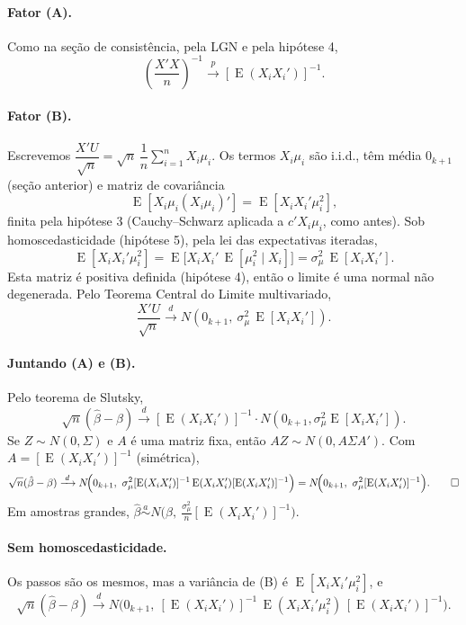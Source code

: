 \documentclass[12pt,a4paper]{article}
\newcommand{\E}{\operatorname{E}}
\newcommand{\convp}{\xrightarrow{\;p\;}}
\newcommand{\convd}{\xrightarrow{\;d\;}}
\begin{document}
\paragraph{Fator (A).} Como na seção de consistência, pela LGN e pela hipótese 4,
\[
  \left(\frac{X'X}{n}\right)^{-1}\convp[\E(X_iX_i')]^{-1}.
\]

\paragraph{Fator (B).} Escrevemos $\dfrac{X'U}{\sqrt n}=\sqrt n\,\dfrac1n\sum_{i=1}^nX_i\mu_i$. Os termos $X_i\mu_i$ são i.i.d., têm média $0_{k+1}$ (seção anterior) e matriz de covariância
\[
  \E[X_i\mu_i(X_i\mu_i)']=\E[X_iX_i'\mu_i^2],
\]
finita pela hipótese 3 (Cauchy--Schwarz aplicada a $c'X_i\mu_i$, como antes). Sob homoscedasticidade (hipótese 5), pela lei das expectativas iteradas,
\[
  \E[X_iX_i'\mu_i^2]=\E\big[X_iX_i'\,\E[\mu_i^2\mid X_i]\big]=\sigma_\mu^2\,\E[X_iX_i'].
\]
Esta matriz é positiva definida (hipótese 4), então o limite é uma normal não degenerada. Pelo Teorema Central do Limite multivariado,
\[
  \frac{X'U}{\sqrt n}\convd N\!\left(0_{k+1},\ \sigma_\mu^2\,\E[X_iX_i']\right).
\]

\paragraph{Juntando (A) e (B).} Pelo teorema de Slutsky,
\[
  \sqrt n(\hat\beta-\beta)\convd[\E(X_iX_i')]^{-1}\cdot N\!\left(0_{k+1},\sigma_\mu^2\E[X_iX_i']\right).
\]
Se $Z\sim N(0,\Sigma)$ e $A$ é uma matriz fixa, então $AZ\sim N(0,A\Sigma A')$. Com $A=[\E(X_iX_i')]^{-1}$ (simétrica),
\[
  \sqrt n(\hat\beta-\beta)\convd N\!\Big(0_{k+1},\ \sigma_\mu^2[\E(X_iX_i')]^{-1}\E(X_iX_i')[\E(X_iX_i')]^{-1}\Big)
  = N\!\Big(0_{k+1},\ \sigma_\mu^2[\E(X_iX_i')]^{-1}\Big). \qed
\]
Em amostras grandes, $\hat\beta\overset{a}{\sim}N\!\big(\beta,\ \tfrac{\sigma_\mu^2}{n}[\E(X_iX_i')]^{-1}\big)$.

\paragraph{Sem homoscedasticidade.} Os passos são os mesmos, mas a variância de (B) é $\E[X_iX_i'\mu_i^2]$, e
\[
  \sqrt n(\hat\beta-\beta)\convd N\!\Big(0_{k+1},\ [\E(X_iX_i')]^{-1}\,\E(X_iX_i'\mu_i^2)\,[\E(X_iX_i')]^{-1}\Big).
\]
\end{document}
